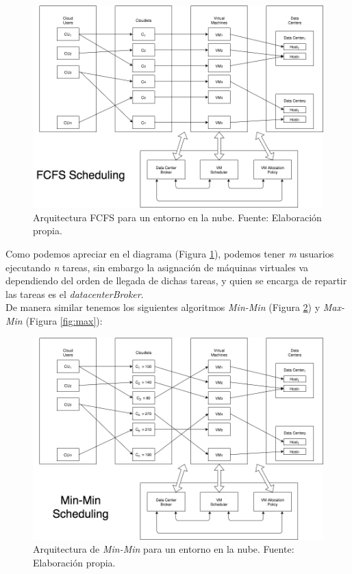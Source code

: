 \renewcommand\thefigure{\arabic{figure}}
\begin{figure}[h!]
	\centering
	\includegraphics[scale=0.4]{media/imagentres}
	\caption{Arquitectura FCFS para un entorno en la nube. Fuente: Elaboraci\'on propia.}
	\label{fig:fcfs}
\end{figure}

Como podemos apreciar en el diagrama (Figura \ref{fig:fcfs}), podemos tener \emph{m} usuarios ejecutando \emph{n} tareas, sin embargo la asignaci\'on de m\'aquinas virtuales va dependiendo del orden de llegada de dichas tareas, y quien se encarga de repartir las tareas es el \textit{datacenterBroker}. \\

De manera similar tenemos los siguientes algoritmos \textit{Min-Min} (Figura \ref{fig:min}) y \textit{Max-Min} (Figura \ref{fig:max}):

\newpage

\renewcommand\thefigure{\arabic{figure}}
\begin{figure}[h!]
	\centering
	\includegraphics[scale=0.4]{media/imagencinco}
	\caption{Arquitectura de \textit{Min-Min} para un entorno en la nube. Fuente: Elaboraci\'on propia.}
	\label{fig:min}
\end{figure}

